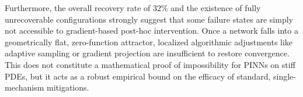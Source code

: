 Furthermore, the overall recovery rate of $32\%$ and the existence of fully unrecoverable configurations strongly suggest that some failure states are simply not accessible to gradient-based post-hoc intervention. Once a network falls into a geometrically flat, zero-function attractor, localized algorithmic adjustments like adaptive sampling or gradient projection are insufficient to restore convergence. This does not constitute a mathematical proof of impossibility for PINNs on stiff PDEs, but it acts as a robust empirical bound on the efficacy of standard, single-mechanism mitigations.
